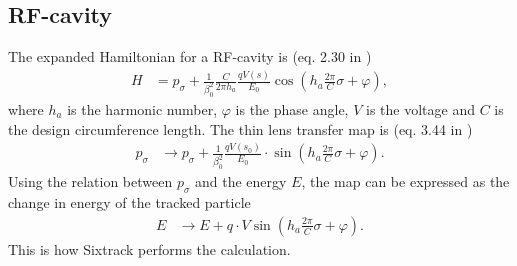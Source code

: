 \documentclass[english]{article}
\begin{document}
\subsection{RF-cavity}
The expanded Hamiltonian for a RF-cavity is (eq. 2.30 in \cite{ripken95})
\begin{align}
  H & = p_\sigma
  + \frac{1}{\beta_0^2} \frac{C}{2\pi h_a} \frac{qV(s)}{E_0} 
  \cos\left(h_a\frac{2\pi}{C}\sigma+\varphi\right),
\end{align}
where $h_a$ is the harmonic number, $\varphi$ is the phase angle, $V$ is the voltage and 
$C$ is the design circumference length. The thin lens transfer map is (eq. 3.44 in \cite{ripken95})
\begin{align}
  p_\sigma &\to p_\sigma + \frac{1}{\beta_0^2}\frac{qV(s_0)}{E_0} \cdot 
  \sin\left(h_a\frac{2\pi}{C}\sigma+\varphi\right).
\end{align}
Using the relation between $p_\sigma$ and the energy $E$, the map can be expressed as
the change in energy of the tracked particle
\begin{align}
  E &\to E + q\cdot V \sin\left(h_a\frac{2\pi}{C}\sigma+\varphi\right).
\end{align}
This is how Sixtrack performs the calculation.
\end{document}
